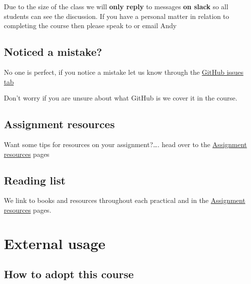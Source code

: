 \documentclass[
]{book}
\begin{document}
Due to the size of the class we will \textbf{only reply} to messages \textbf{on slack} so all students can see the discussion. If you have a personal matter in relation to completing the course then please speak to or email Andy

\hypertarget{noticed-a-mistake}{%
\section*{Noticed a mistake?}\label{noticed-a-mistake}}

No one is perfect, if you notice a mistake let us know through the \href{https://github.com/andrewmaclachlan/CASA0005repo/issues}{GitHub issues tab}

Don't worry if you are unsure about what GitHub is we cover it in the course.

\hypertarget{assignment-resources}{%
\section*{Assignment resources}\label{assignment-resources}}

Want some tips for resources on your assignment?\ldots. head over to the \protect\hyperlink{assignment-resources}{Assignment resources} pages

\hypertarget{reading-list}{%
\section*{Reading list}\label{reading-list}}

We link to books and resources throughout each practical and in the \protect\hyperlink{assignment-resources}{Assignment resources} pages.

\hypertarget{external-usage}{%
\chapter*{External usage}\label{external-usage}}

\hypertarget{how-to-adopt-this-course}{%
\section*{How to adopt this course}\label{how-to-adopt-this-course}}
\end{document}
